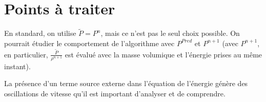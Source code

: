 \section*{Points à traiter}




En standard, on utilise $\widetilde{P}=P^n$, mais ce n'est pas le seul choix
possible. On pourrait étudier le comportement de l'algorithme avec $P^{Pred}$ et
$P^{n+1}$ (avec $P^{n+1}$, en particulier,
$\displaystyle\frac{\widetilde{P}}{\rho^{n+1}}$
est évalué avec la masse volumique et l'énergie prises au même instant).

La présence d'un terme source externe dans l'équation de l'énergie génère des
oscillations de vitesse qu'il est important d'analyser et de comprendre.
